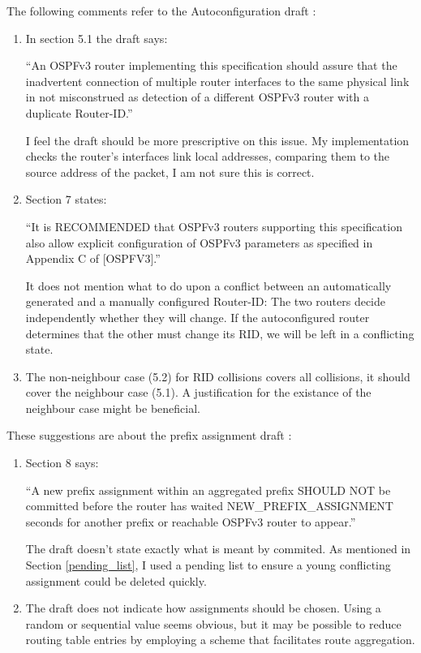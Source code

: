 \documentclass[12pt,a4paper,twoside]{report}
\begin{document}
The following comments refer to the Autoconfiguration draft
\cite{draft-ietf-ospf-ospfv3-autoconfig-02}:
\begin{enumerate}
	\item In section 5.1 the draft says: 

		``An OSPFv3 router implementing this specification should assure that the
		inadvertent connection of multiple router interfaces to the same physical
		link in not misconstrued as detection of a different OSPFv3 router with a
		duplicate Router-ID.'' 

		 I feel the draft should be more prescriptive on this issue.  My
		 implementation checks the router's interfaces link local addresses,
		 comparing them to the source address of the packet, I am not sure this is
		 correct.
	\item Section 7 states:

		``It is RECOMMENDED that OSPFv3 routers supporting this specification
		also allow explicit configuration of OSPFv3 parameters as specified
		in Appendix C of [OSPFV3].''

		It does not mention what to do upon a conflict between an automatically
		generated and a manually configured Router-ID: The two routers decide
		independently whether they will change. If the autoconfigured router
		determines that the other must change its RID, we will be left in a
		conflicting state.
	\item  The non-neighbour case (5.2) for RID collisions covers all collisions,
		it should cover the neighbour case (5.1). A justification for the existance
		of the neighbour case might be beneficial.
\end{enumerate}

These suggestions are about the prefix assignment draft
\cite{draft-arkko-homenet-prefix-assignment-03}:
\begin{enumerate}
	\item Section 8 says:

		``A new prefix assignment within an aggregated prefix SHOULD NOT be
		committed before the router has waited NEW\_PREFIX\_ASSIGNMENT seconds for
		another prefix or reachable OSPFv3 router to appear.''

		The draft doesn't state exactly what is meant by commited. As mentioned in
		Section \ref{pending_list}, I used a pending list to ensure a young
		conflicting assignment could be deleted quickly.
	\item The draft does not indicate how assignments should be chosen. Using a
		random or sequential value seems obvious, but it may be possible to reduce
		routing table entries by employing a scheme that facilitates route
		aggregation. 
\end{enumerate}
\end{document}
